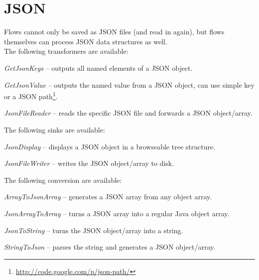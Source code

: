 \section{JSON}
\label{json}
Flows cannot only be saved as JSON files (and read in again), but flows 
themselves can process JSON data structures as well. \\
The following transformers are available:
\begin{tight_itemize}
	\item \textit{GetJsonKeys} -- outputs all named elements
	of a JSON object.
	\item \textit{GetJsonValue} -- outputs the named value 
	from a JSON object, can use simple key or a JSON 
	path\footnote{\url{http://code.google.com/p/json-path/}{}}.
	\item \textit{JsonFileReader} -- reads the specific JSON file and forwards
	a JSON object/array.
\end{tight_itemize}
The following sinks are available:
\begin{tight_itemize}
	\item \textit{JsonDisplay} -- displays a JSON object in a browseable 
	tree structure.
	\item \textit{JsonFileWriter} -- writes the JSON object/array to disk.
\end{tight_itemize}
The following conversion are available:
\begin{tight_itemize}
	\item \textit{ArrayToJsonArray} -- generates a JSON array from any object
	array.
	\item \textit{JsonArrayToArray} -- turns a JSON array into a regular Java 
	object array.
	\item \textit{JsonToString} -- turns the JSON object/array into a string.
	\item \textit{StringToJson} -- parses the string and generates a JSON 
	object/array.
\end{tight_itemize}

\newpage
